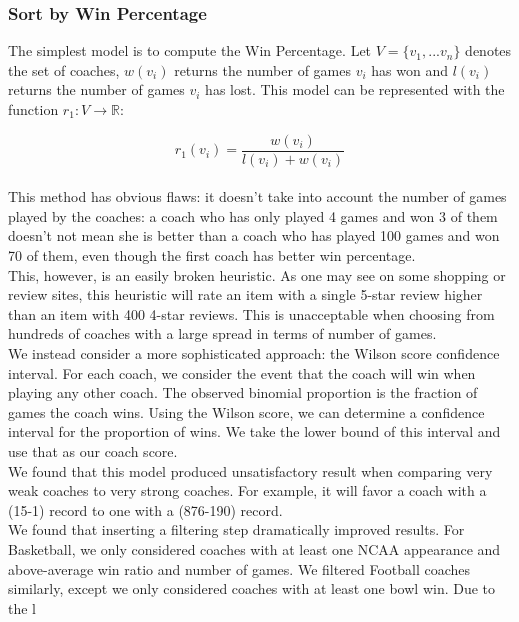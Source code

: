 \documentclass[titlepage]{article}
\begin{document}
\subsubsection{Sort by Win Percentage}
The simplest model is to compute the Win Percentage. Let $V = \{v_1, ... v_n\}$ denotes the set of coaches, $w(v_i)$ returns the number of games $v_i$ has won and $l(v_i)$ returns the number of games $v_i$ has lost. This model can be represented with the function $r_1: V \rightarrow \mathbb{R}$:

$$r_1(v_i) = \frac{w(v_i)}{l(v_i) + w(v_i)}$$
\\

\noindent This method has obvious flaws: it doesn't take into account the number of games played by the coaches: a coach who has only played 4 games and won 3 of them doesn't not mean she is better than a coach who has played 100 games and won 70 of them, even though the first coach has better win percentage.
\\

\noindent This, however, is an easily broken heuristic. As one may see on some shopping or review sites, this heuristic will rate an item with a single 5-star review higher than an item with 400 4-star reviews. This is unacceptable when choosing from hundreds of coaches with a large spread in terms of number of games. 
\\

\noindent We instead consider a more sophisticated approach: the Wilson score confidence interval. For each coach, we consider the event that the coach will win when playing any other coach. The observed binomial proportion is the fraction of games the coach wins. Using the Wilson score, we can determine a confidence interval for the proportion of wins. We take the lower bound of this interval and use that as our coach score.
\\

\noindent We found that this model produced unsatisfactory result when comparing very weak coaches to very strong coaches. For example, it will favor a coach with a (15-1) record to one with a (876-190) record.
\\

\noindent We found that inserting a filtering step dramatically improved results. For Basketball, we only considered coaches with at least one NCAA appearance and above-average win ratio and number of games. We filtered Football coaches similarly, except we only considered coaches with at least one bowl win. Due to the l
\\
\end{document}

